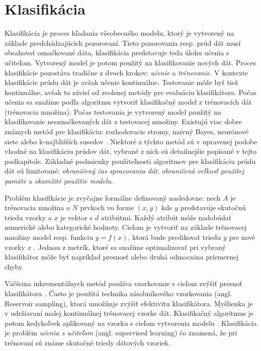 \section{Klasifikácia}
\label{ulohy-klasifikacia}
Klasifikácia je proces hľadania všeobecného modelu, ktorý je vytvorený na základe predchádzajúcich pozorovaní. Tieto pozorovania resp. prúd dát musí obsahovať označkované dáta, klasifikácia predstavuje teda úlohu učenia s učiteľom. Vytvorený model je potom použitý na klasifikovanie nových dát. Proces klasifikácie pozostáva tradične z dvoch krokov: \textit{učenie} a \textit{trénovanie}. V kontexte klasifikácie prúdu dát je avšak učenie kontinuálne. Testovanie môže byť tiež kontinuálne, avšak to závisí od zvolenej metódy pre evaluáciu klasifikátora. Počas učenia sa snažíme podľa algoritmu vytvoriť klasifikačný model z trénovacích dát (trénovacia množina). Počas testovania je vytvorený model použitý na klasifikovanie neoznačkovaných dát z testovacej množiny. Existujú viac dobre známych metód pre klasifikáciu: rozhodovacie stromy, naivný Bayes, neurónové siete alebo k-najbližších susedov \citep{nguyen2015survey}. Niektoré z týchto metód sú v upravenej podobe vhodné na klasifikáciu prúdov dát, vybrané z nich sú detailnejšie popísané v tejto podkapitole. Základné podmienky použiteľnosti algoritmov pre klasifikáciu prúdu dát sú limitované: \textit{ohraničený čas spracovania dát}, \textit{ohraničená veľkosť použitej pamäte} a \textit{okamžité použitie modelu}.
\par
Problém klasifikácie je zvyčajne formálne definovaný nasledovne: nech $A$ je trénovacia množina o $N$ prvkoch vo forme $(x,y)$ kde $y$ predstavuje skutočnú triedu vzorky a $x$ je vektor s $d$ atribútmi. Každý atribút môže nadobúdať numerické alebo kategorické hodnoty. Cieľom je vytvoriť na základe trénovacej množiny model resp. funkciu $y=f(x)$, ktorá bude predikovať triedu $y$ pre nové vzorky $x$ \citep{domingos2000mining}. Jednou z metrík, ktoré sa snažíme optimalizovať pri vybraný klasifikátor môže byť napríklad presnosť alebo druhá odmocnina priemernej chyby.
\par
Väčšsina inkrementálnych metód používa vzorkovanie s cieľom zvýšiť presnoť klasifikátora \citep{aggarwal2014survey, nguyen2015survey}. Často je použitá technika zásobníkového vzorkovania (angl. Reservoir sampling), ktorá umožňuje zvýšiť efektivitu klasifikátora. Myšlienka je v udržiavaní malej kontinuálnej trénovacej vzorke dát. Klasifikačný algoritmus je potom kedykoľvek aplikovaný na vzorku s cieľom vytvorenia modelu \citep{aggarwal2014survey}. Klasifikácia je problém \textit{učenia s učiteľom} (angl. supervised learning) čo znamená, že pri trénovaní sú známe skutočné triedy dátových vzoriek.

